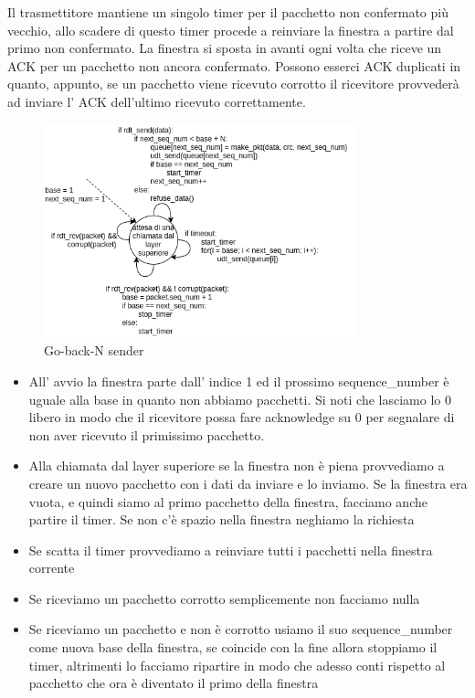 Il trasmettitore mantiene un singolo timer per il pacchetto non confermato più vecchio, allo scadere di questo timer procede a reinviare la finestra a partire dal primo non confermato.
La finestra si sposta in avanti ogni volta che riceve un ACK per un pacchetto non ancora confermato.
Possono esserci ACK duplicati in quanto, appunto, se un pacchetto viene ricevuto corrotto il ricevitore provvederà ad inviare l' ACK dell'ultimo ricevuto correttamente.
\begin{figure}[H]
    \centering
    \includegraphics[width=340px]{images/3_Reti_connessione_diretta/go-back-n_sender.png}
    \caption{Go-back-N sender}
\end{figure}
\begin{itemize}
    \item All' avvio la finestra parte dall' indice 1 ed il prossimo sequence\_number è uguale alla base in quanto non abbiamo pacchetti.
    Si noti che lasciamo lo 0 libero in modo che il ricevitore possa fare acknowledge su 0 per segnalare di non aver ricevuto il primissimo pacchetto.
    
    \item Alla chiamata dal layer superiore se la finestra non è piena provvediamo a creare un nuovo pacchetto con i dati da inviare e lo inviamo.
    Se la finestra era vuota, e quindi siamo al primo pacchetto della finestra, facciamo anche partire il timer.
    Se non c'è spazio nella finestra neghiamo la richiesta
    
    \item Se scatta il timer provvediamo a reinviare tutti i pacchetti nella finestra corrente
    
    \item Se riceviamo un pacchetto corrotto semplicemente non facciamo nulla
    
    \item Se riceviamo un pacchetto e non è corrotto usiamo il suo sequence\_number come nuova base della finestra, se coincide con la fine allora stoppiamo il timer, altrimenti lo facciamo ripartire in modo che adesso conti rispetto al pacchetto che ora è diventato il primo della finestra
\end{itemize}


